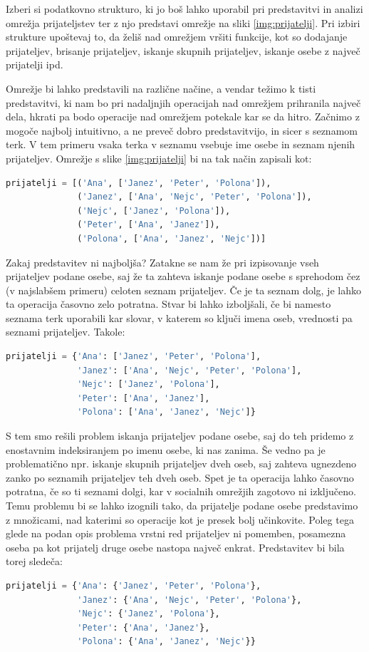 \begin{zgled}
Izberi si podatkovno strukturo, ki jo boš lahko uporabil pri predstavitvi in analizi omrežja prijateljstev ter z njo predstavi omrežje na sliki \ref{img:prijatelji}. Pri izbiri strukture upoštevaj to, da želiš nad omrežjem vršiti funkcije, kot so dodajanje prijateljev, brisanje prijateljev, iskanje skupnih prijateljev, iskanje osebe z največ prijatelji ipd.
\end{zgled}
\begin{resitev}
Omrežje bi lahko predstavili na različne načine, a vendar težimo k tisti predstavitvi, ki nam bo pri nadaljnjih operacijah nad omrežjem prihranila največ dela, hkrati pa bodo operacije nad omrežjem potekale kar se da hitro. Začnimo z mogoče najbolj intuitivno, a ne preveč dobro predstavitvijo, in sicer s seznamom terk. V tem primeru vsaka terka v seznamu vsebuje ime osebe in seznam njenih prijateljev. Omrežje s slike \ref{img:prijatelji} bi na tak način zapisali kot:
\begin{lstlisting}[language=Python]
prijatelji = [('Ana', ['Janez', 'Peter', 'Polona']),
              ('Janez', ['Ana', 'Nejc', 'Peter', 'Polona']),
              ('Nejc', ['Janez', 'Polona']),
              ('Peter', ['Ana', 'Janez']),
              ('Polona', ['Ana', 'Janez', 'Nejc'])]
\end{lstlisting}
Zakaj predstavitev ni najboljša? Zatakne se nam že pri izpisovanje vseh prijateljev podane osebe, saj že ta zahteva iskanje podane osebe s sprehodom čez (v najslabšem primeru) celoten seznam prijateljev. Če je ta seznam dolg, je lahko ta operacija časovno zelo potratna. Stvar bi lahko izboljšali, če bi namesto seznama terk uporabili kar slovar, v katerem so ključi imena oseb, vrednosti pa seznami prijateljev. Takole: 
\begin{lstlisting}[language=Python]
prijatelji = {'Ana': ['Janez', 'Peter', 'Polona'],
              'Janez': ['Ana', 'Nejc', 'Peter', 'Polona'],
              'Nejc': ['Janez', 'Polona'],
              'Peter': ['Ana', 'Janez'],
              'Polona': ['Ana', 'Janez', 'Nejc']}
\end{lstlisting}
S tem smo rešili problem iskanja prijateljev podane osebe, saj do teh pridemo z enostavnim indeksiranjem po imenu osebe, ki nas zanima. Še vedno pa je problematično npr. iskanje skupnih prijateljev dveh oseb, saj zahteva ugnezdeno zanko po seznamih prijateljev teh dveh oseb. Spet je ta operacija lahko časovno potratna, če so ti seznami dolgi, kar v socialnih omrežjih zagotovo ni izključeno. Temu problemu bi se lahko izognili tako, da prijatelje podane osebe predstavimo z množicami, nad katerimi so operacije kot je presek bolj učinkovite. Poleg tega glede na podan opis problema vrstni red prijateljev ni pomemben, posamezna oseba pa kot prijatelj druge osebe nastopa največ enkrat. Predstavitev bi bila torej sledeča:\begin{lstlisting}[language=Python]
prijatelji = {'Ana': {'Janez', 'Peter', 'Polona'},
              'Janez': {'Ana', 'Nejc', 'Peter', 'Polona'},
              'Nejc': {'Janez', 'Polona'},
              'Peter': {'Ana', 'Janez'},
              'Polona': {'Ana', 'Janez', 'Nejc'}}
\end{lstlisting}
\end{resitev}

